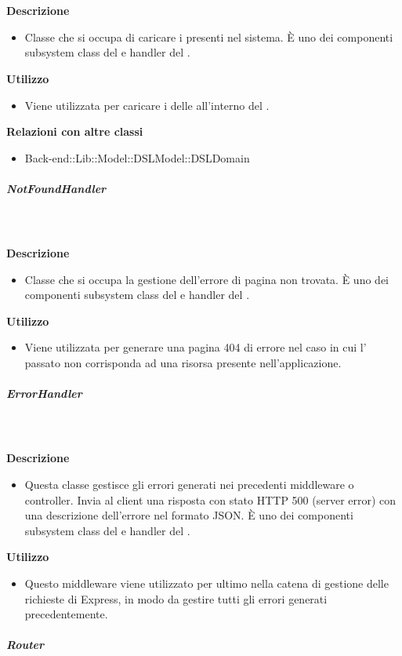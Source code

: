 				\textbf{\\ \\ Descrizione} 
					\begin{itemize}
						\item[] Classe che si occupa di caricare i  presenti nel sistema. È uno dei componenti subsystem class del   e handler del  .
					\end{itemize}      
				\textbf{Utilizzo}  
					\begin{itemize}
						\item[] Viene utilizzata per caricare i  delle  all'interno del .
					\end{itemize}
					\textbf{Relazioni con altre classi}
					\begin{itemize}
							\item{Back-end::Lib::Model::DSLModel::DSLDomain}
					\end{itemize}
			\subparagraph{NotFoundHandler}
				
				\textbf{\\ \\ Descrizione} 
					\begin{itemize}
						\item[] Classe che si occupa la gestione dell'errore di pagina non trovata. È uno dei componenti subsystem class del   e handler del  .
					\end{itemize}      
				\textbf{Utilizzo}  
					\begin{itemize}
						\item[] Viene utilizzata per generare una pagina 404 di errore nel caso in cui l' passato non corrisponda ad una risorsa presente nell'applicazione.
					\end{itemize}
			\subparagraph{ErrorHandler}
				
				\textbf{\\ \\ Descrizione} 
					\begin{itemize}
						\item[] Questa classe gestisce gli errori generati nei precedenti middleware o controller. Invia al client una risposta con stato HTTP 500 (server error) con una descrizione dell'errore nel formato JSON.
È uno dei componenti subsystem class del   e handler del  .
					\end{itemize}      
				\textbf{Utilizzo}  
					\begin{itemize}
						\item[] Questo middleware viene utilizzato per ultimo nella catena di gestione delle richieste di Express, in modo da gestire tutti gli errori generati precedentemente.
					\end{itemize}
			\subparagraph{Router}
				
